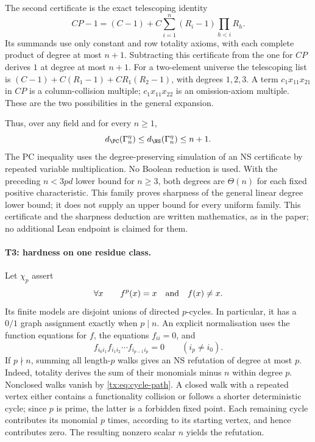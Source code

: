 The second certificate is the exact telescoping identity
\[
 CP-1=(C-1)+C\sum_{i=1}^n(R_i-1)\prod_{h<i}R_h.
\]
Its summands use only constant and row totality axioms, with each
complete product of degree at most $n+1$. Subtracting this certificate
from the one for $CP$ derives $1$ at degree at most $n+1$.
For a two-element universe the telescoping list is
$(C-1)+C(R_1-1)+CR_1(R_2-1)$, with degrees $1,2,3$.
A term $c_1x_{11}x_{21}$ in $CP$ is a column-collision multiple;
$c_1x_{11}x_{22}$ is an omission-axiom multiple. These are the two
possibilities in the general expansion.

Thus, over any field and for every $n\ge1$,
\[
 d_{\PC}(\Gamma_n^\eta)\le d_{\NS}(\Gamma_n^\eta)\le n+1.
\]
The PC inequality uses the degree-preserving simulation of an NS
certificate by repeated variable multiplication. No Boolean reduction
is used. With the preceding $n<3pd$ lower bound for $n\ge3$, both
degrees are $\Theta(n)$ for each fixed positive characteristic.
This family proves sharpness of the general linear degree lower bound; it does
not supply an upper bound for every uniform family. This certificate
and the sharpness deduction are written mathematics, as in the paper;
no additional Lean endpoint is claimed for them.

\paragraph{T3: hardness on one residue class.}
Let $\chi_p$ assert
\[
 \forall x\qquad f^p(x)=x\quad\hbox{and}\quad f(x)\ne x.
\]
Its finite models are disjoint unions of directed $p$-cycles. In particular,
it has a $0/1$ graph assignment exactly when $p\mid n$. An explicit
normalisation uses the function equations for $f$, the equations $f_{ii}=0$,
and
\begin{equation}\label{tx:eq:cycle-path}
 f_{i_0i_1}f_{i_1i_2}\cdots f_{i_{p-1}i_p}=0
 \qquad(i_p\ne i_0).
\end{equation}
If $p\nmid n$, summing all length-$p$ walks gives an NS refutation of degree
at most $p$. Indeed, totality derives the sum of their monomials minus $n$
within degree $p$. Nonclosed walks vanish by \eqref{tx:eq:cycle-path}.
A closed walk with a repeated vertex either contains a functionality
collision or follows a shorter deterministic cycle; since $p$ is prime,
the latter is a forbidden fixed point. Each remaining cycle contributes its
monomial $p$ times, according to its starting vertex, and hence contributes
zero. The resulting nonzero scalar $n$ yields the refutation.

